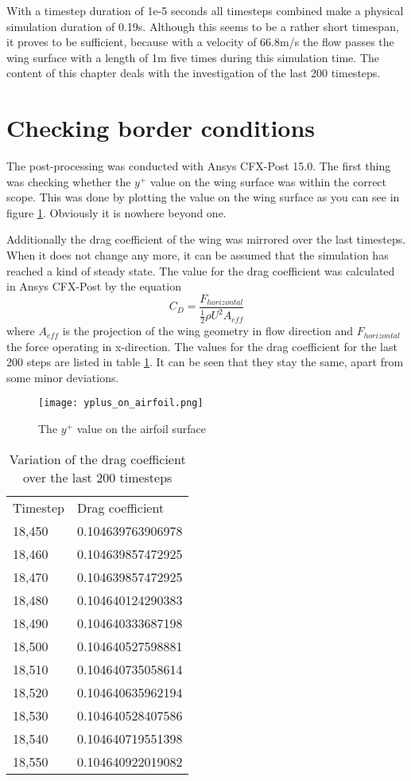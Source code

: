 With a timestep duration of 1e-5 seconds all timesteps combined make a physical simulation duration of 0.19s. Although this seems to be a rather short timespan, it proves to be sufficient, because with a velocity of 66.8m/s the flow passes the wing surface with a length of 1m five times during this simulation time. The content of this chapter deals with the investigation of the last 200 timesteps.
\section{Checking border conditions}
The post-processing was conducted with Ansys CFX-Post 15.0. The first thing was checking whether the $y^+$ value on the wing surface was within the correct scope. This was done by plotting the value on the wing surface as you can see in figure \ref{fig:yplus}. Obviously it is nowhere beyond one.

Additionally the drag coefficient of the wing was mirrored over the last timesteps. When it does not change any more, it can be assumed that the simulation has reached a kind of steady state. The value for the drag coefficient was calculated in Ansys CFX-Post by the equation
\begin{equation}
C_D = \frac{F_{horizontal}}{\frac{1}{2} \rho U^2 A_{eff}}
\end{equation}
where $A_{eff}$ is the projection of the wing geometry in flow direction and $F_{horizontal}$ the force operating in x-direction.
The values for the drag coefficient for the last 200 steps are listed in table \ref{tab:htc_values}. It can be seen that they stay the same, apart from some minor deviations.
\begin{figure}[ht]
\centering
\texttt{[image: yplus\_on\_airfoil.png]}
\caption{The $y^+$ value on the airfoil surface}
\label{fig:yplus}
\end{figure}

\begin{table}[ht]
\centering
\caption{Variation of the drag coefficient over the last 200 timesteps}
\label{tab:htc_values}
\begin{tabular}{ll}
Timestep&Drag coefficient\\
18,450&0.104639763906978\\
18,460&0.104639857472925\\
18,470&0.104639857472925\\
18,480&0.104640124290383\\
18,490&0.104640333687198\\
18,500&0.104640527598881\\
18,510&0.104640735058614\\
18,520&0.104640635962194\\
18,530&0.104640528407586\\
18,540&0.104640719551398\\
18,550&0.104640922019082\\
\end{tabular}
\end{table}


